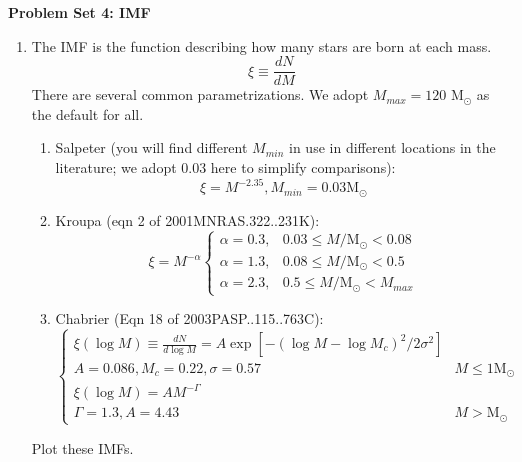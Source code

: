 \documentclass{article}
\newcommand{\msun}{\ensuremath{\mathrm{M}_\odot}\xspace}
\begin{document}
\noindent\textbf{Problem Set 4: IMF}

\begin{enumerate}
    \item The IMF is the function describing how many stars are born at each mass.
        \begin{equation}
            \xi \equiv \frac{dN}{dM}
        \end{equation}
        There are several common parametrizations.  We adopt $M_{max} = 120$ \msun
        as the default for all.
        \begin{enumerate}
            \item Salpeter (you will find different $M_{min}$ in use in
                different locations in the literature; we adopt 0.03 here
                to simplify comparisons):
            \begin{equation}
                \xi = M^{-2.35}, M_{min}=0.03 \msun
            \end{equation}

            \item Kroupa (eqn 2 of 2001MNRAS.322..231K):\\
            $$ \xi = M^{-\alpha}
            \begin{cases}
                  \alpha=0.3, & 0.03 \leq M/\msun < 0.08 \\
                  \alpha=1.3, & 0.08 \leq M/\msun < 0.5 \\
                  \alpha=2.3, & 0.5 \leq M/\msun < M_{max}
            \end{cases}
            $$

            \item Chabrier (Eqn 18 of 2003PASP..115..763C):\\
                $$
            \begin{cases}
                \xi(\log M) \equiv \frac{dN}{d\log M} = A \exp\left[-(\log M - \log M_c)^2/2\sigma^2\right]  \\
                A = 0.086, M_c = 0.22, \sigma=0.57 &  M\leq1 \msun\\
                \xi(\log M) = A M^{-\Gamma}   \\
                \Gamma = 1.3, A = 4.43 & M>\msun
            \end{cases}
            $$
    

        \end{enumerate}
    Plot these IMFs.


\end{enumerate}
\end{document}
